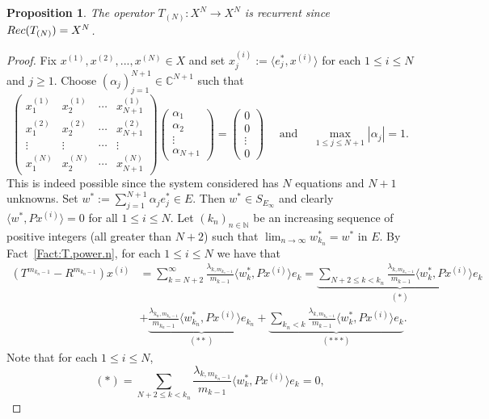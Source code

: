 \documentclass[openright,11pt]{article}
\theoremstyle{plain}
\newtheorem{proposition}[theorem]{Proposition}
\theoremstyle{definition}
\newcommand{\NN}{\mathbb{N}}
\newcommand{\CC}{\mathbb{C}}
\newcommand{\Rec}{\textup{Rec}}
\newcommand{\ep}[2]{\langle #1 , #2 \rangle}
\begin{document}
\begin{proposition}
	The operator $T_{(N)}:X^N \longrightarrow X^N$ is recurrent since $\Rec(T_{(N)})=X^N$.
\end{proposition}
\begin{proof}
	Fix $x^{(1)},x^{(2)},...,x^{(N)} \in X$ and set $x_j^{(i)} := \ep{e_j^*}{x^{(i)}}$ for each $1\leq i\leq N$ and $j\geq 1$. Choose $(\alpha_j)_{j=1}^{N+1} \in \CC^{N+1}$ such that
	\[
	\begin{pmatrix} x_1^{(1)} & x_2^{(1)} & \cdots & x_{N+1}^{(1)} \\ x_1^{(2)} & x_2^{(2)} & \cdots & x_{N+1}^{(2)} \\ \vdots & \vdots & \cdots & \vdots \\  x_1^{(N)} & x_2^{(N)} & \cdots & x_{N+1}^{(N)} \end{pmatrix} \begin{pmatrix} \alpha_1 \\ \alpha_2 \\ \vdots \\ \alpha_{N+1} \end{pmatrix} = \begin{pmatrix} 0 \\ 0 \\ \vdots \\ 0 \end{pmatrix} \quad \text{ and } \quad \max_{1\leq j\leq N+1} |\alpha_j| = 1.
	\]
	This is indeed possible since the system considered has $N$ equations and $N+1$ unknowns. Set $w^*:=\sum_{j=1}^{N+1} \alpha_je_j^* \in E$. Then $w^* \in S_{E_{\infty}}$ and clearly $\ep{w^*}{Px^{(i)}}=0$ for all $1\leq i\leq N$. Let $(k_n)_{n\in\NN}$ be an increasing sequence of positive integers (all greater than $N+2$) such that $\lim_{n\to\infty} w_{k_n}^* = w^*$ in $E$. By Fact~\ref{Fact:T.power.n}, for each $1 \leq i \leq N$ we have that
	\begin{align*}
		\left(T^{m_{k_n-1}}-R^{m_{k_n-1}}\right)x^{(i)} &= \sum_{k=N+2}^{\infty} \frac{\lambda_{k,m_{k_n-1}}}{m_{k-1}} \ep{w_k^*}{Px^{(i)}} e_k = \underbrace{\sum_{N+2\leq k < k_n} \frac{\lambda_{k,m_{k_n-1}}}{m_{k-1}} \ep{w_k^*}{Px^{(i)}} e_k}_{(*)} \\[8pt]
		&+  \underbrace{\frac{\lambda_{k_n,m_{k_n-1}}}{m_{k_n-1}} \ep{w_{k_n}^*}{Px^{(i)}} e_{k_n}}_{(**)} + \underbrace{\sum_{k_n < k} \frac{\lambda_{k,m_{k_n-1}}}{m_{k-1}} \ep{w_k^*}{Px^{(i)}} e_k}_{(***)}.
	\end{align*}
	Note that for each $1\leq i\leq N$,
	\[
	(*) = \sum_{N+2\leq k < k_n} \frac{\lambda_{k,m_{k_n-1}}}{m_{k-1}} \ep{w_k^*}{Px^{(i)}} e_k = 0,
\]
\end{proof}
\end{document}
